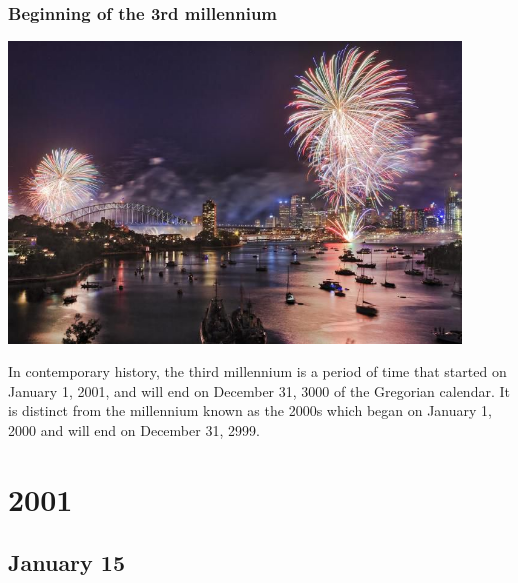 \documentclass[11pt]{report}
\begin{document}
\subsection{Beginning of the 3rd millennium}
\vspace{2mm}\begin{center}\includegraphics[width=12cm]{./img/fireworks.jpg}\end{center}
In contemporary history, the third millennium is a period of time that started on January 1, 2001, and will end on December 31, 3000 of the Gregorian calendar. It is distinct from the millennium known as the 2000s which began on January 1, 2000 and will end on December 31, 2999.

\chapter{2001}
\section{January 15}
\end{document}
